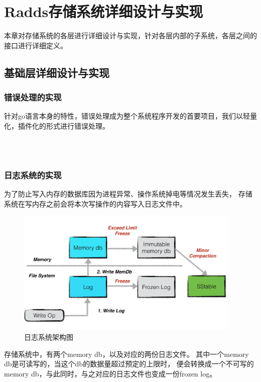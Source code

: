 \section{Radds存储系统详细设计与实现}

	本章对存储系统的各层进行详细设计与实现，针对各层内部的子系统，各层之间的接口进行详细定义。

  \subsection{基础层详细设计与实现}
	
   	\subsubsection{错误处理的实现}

		针对go语言本身的特性，错误处理成为整个系统程序开发的首要项目，我们以轻量化，插件化的形式进行错误处理。
		
		\begin{lstlisting}[caption=Errors , label=code_radds_errors]

 
		\end{lstlisting}                 

	
			
   	\subsubsection{日志系统的实现}
    
	   为了防止写入内存的数据库因为进程异常、操作系统掉电等情况发生丢失，
	   存储系统在写内存之前会将本次写操作的内容写入日志文件中。
    
    \begin{figure}[H]
    	\centering
    	\includegraphics[width=0.95\textwidth]{images/two_log}
    	\caption{日志系统架构图}
    	\label{two_log}
    \end{figure}
	存储系统中，有两个memory db，以及对应的两份日志文件。
	其中一个memory db是可读写的，当这个db的数据量超过预定的上限时，
	便会转换成一个不可写的memory db，与此同时，与之对应的日志文件也变成一份frozen log。

